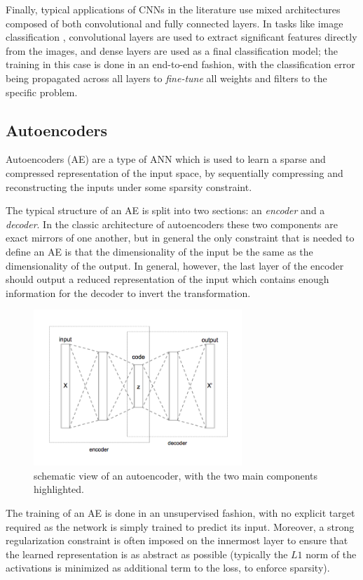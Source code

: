 Finally, typical applications of CNNs in the literature use mixed 
architectures composed of both convolutional and fully connected layers.
In tasks like image classification \cite{simonyan2014vggnet, szegedy2015going}, 
convolutional layers are used to extract significant features directly from the 
images, and dense layers are used as a final classification model; the training 
in this case is done in an end-to-end fashion, with the classification error 
being propagated across all layers to \textit{fine-tune} all weights and filters
to the specific problem.

\subsection{Autoencoders}
Autoencoders (AE) are a type of ANN which is used to learn a sparse and 
compressed representation of the input space, by sequentially compressing and 
reconstructing the inputs under some sparsity constraint.

The typical structure of an AE is split into two sections: an 
\textit{encoder} and a \textit{decoder}. In the classic architecture of 
autoencoders these two components are exact mirrors of one another, but in 
general the only constraint that is needed to define an AE is that
the dimensionality of the input be the same as the dimensionality of the output.
In general, however, the last layer of the encoder should output a reduced 
representation of the input which contains enough information for the decoder to
invert the transformation.
%
\begin{figure}[h]
\includegraphics[width=0.7\textwidth]{pictures/autoencoder}
\centering
\caption{schematic view of an autoencoder, with the two main components 
	 highlighted.}
\end{figure}
%

The training of an AE is done in an unsupervised fashion, with no
explicit target required as the network is simply trained to predict its input.
Moreover, a strong regularization constraint is often imposed on the innermost 
layer to ensure that the learned representation is as abstract as possible 
(typically the $L1$ norm of the activations is minimized as additional term to
 the loss, to enforce sparsity). 

